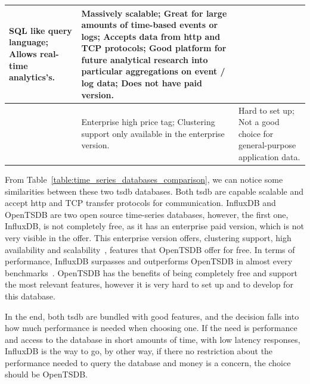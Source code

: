 \begin{table}[H]
\begin{tabularx}{\linewidth} {
            >{\hsize=0.70\hsize}X|
            >{\hsize=1.15\hsize}X|
            >{\hsize=1.15\hsize}X|}
        SQL like query language; \newline
        Allows real-time analytics's.
         & Massively scalable; \newline
        Great for large amounts of time-based events or logs; \newline
        Accepts data from \gls{http} and TCP protocols; \newline
        Good platform for future analytical research into particular aggregations on event / log data; \newline
        Does not have paid version.                                                                                                                                                                                                                                       \\ \hline
        \multicolumn{1}{|l|}{\textbf{Cons}}
         & Enterprise high price tag; \newline
        Clustering support only available in the enterprise version.
         & Hard to set up; \newline
        Not a good choice for general-purpose application data.                                                                                                                                                                                                           \\ \hline
    \end{tabularx}
\end{table}

From Table~\ref{table:time_series_databases_comparison}, we can notice some similarities between these two \gls{tsdb} databases. Both \gls{tsdb} are capable scalable and accept \gls{http} and TCP transfer protocols for communication. InfluxDB and OpenTSDB are two open source time-series databases, however, the first one, InfluxDB, is not completely free, as it has an enterprise paid version, which is not very visible in the offer. This enterprise version offers, clustering support, high availability and scalability~\cite{influxdb_vs_opentsdb}, features that OpenTSDB offer for free. In terms of performance, InfluxDB surpasses and outperforms OpenTSDB in almost every benchmarks~\cite{Noor2017}. OpenTSDB has the benefits of being completely free and support the most relevant features, however it is very hard to set up and to develop for this database.

In the end, both \gls{tsdb} are bundled with good features, and the decision falls into how much performance is needed when choosing one. If the need is performance and access to the database in short amounts of time, with low latency responses, InfluxDB is the way to go, by other way, if there no restriction about the performance needed to query the database and money is a concern, the choice should be OpenTSDB.

